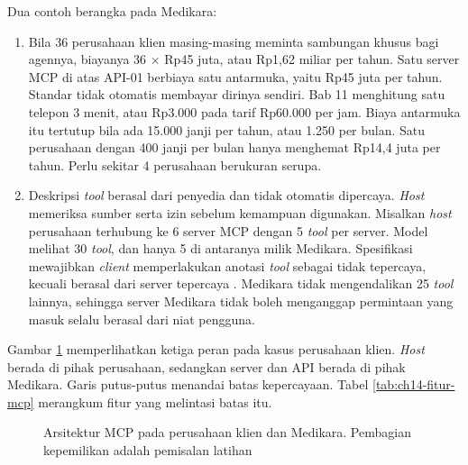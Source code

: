 Dua contoh berangka pada Medikara:
\begin{enumerate}
  \item Bila 36 perusahaan klien masing-masing meminta sambungan khusus bagi agennya, biayanya 36 $\times$ Rp45 juta, atau Rp1,62 miliar per tahun. Satu server
        MCP di atas API-01 berbiaya satu antarmuka, yaitu Rp45 juta per tahun. Standar tidak otomatis membayar dirinya sendiri. Bab 11 menghitung satu telepon
        3 menit, atau Rp3.000 pada tarif Rp60.000 per jam. Biaya antarmuka itu tertutup bila ada 15.000 janji per tahun, atau 1.250 per bulan. Satu perusahaan
        dengan 400 janji per bulan hanya menghemat Rp14,4 juta per tahun. Perlu sekitar 4 perusahaan berukuran serupa.
  \item Deskripsi \textit{tool} berasal dari penyedia dan tidak otomatis dipercaya. \textit{Host} memeriksa sumber serta izin sebelum kemampuan digunakan. Misalkan
        \textit{host} perusahaan terhubung ke 6 server MCP dengan 5 \textit{tool} per server. Model melihat 30 \textit{tool}, dan hanya 5 di antaranya milik
        Medikara. Spesifikasi mewajibkan \textit{client} memperlakukan anotasi \textit{tool} sebagai tidak tepercaya, kecuali berasal dari server tepercaya
        \cite{c14-mcp-tools}. Medikara tidak mengendalikan 25 \textit{tool} lainnya, sehingga server Medikara tidak boleh menganggap permintaan yang masuk selalu
        berasal dari niat pengguna.
\end{enumerate}

Gambar \ref{fig:ch14-arsitektur-mcp} memperlihatkan ketiga peran pada kasus perusahaan klien. \textit{Host} berada di pihak perusahaan, sedangkan server dan
API berada di pihak Medikara. Garis putus-putus menandai batas kepercayaan. Tabel \ref{tab:ch14-fitur-mcp} merangkum fitur yang melintasi batas itu.

\begin{figure}[!htb]
  \centering
  \resizebox{\textwidth}{!}{}
  \caption{Arsitektur MCP pada perusahaan klien dan Medikara. Pembagian kepemilikan adalah pemisalan latihan}
  \label{fig:ch14-arsitektur-mcp}
\end{figure}

